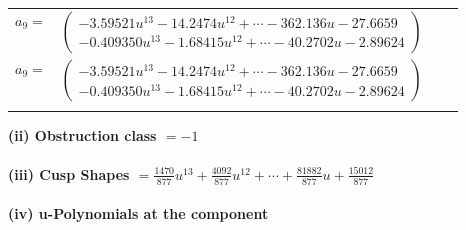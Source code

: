 \documentclass[1p]{elsarticle_modified}
\theoremstyle{definition}
\begin{document}
\begin{tabular}{m{7pt} m{180pt} m{7pt} m{180pt} }
\flushright $a_{9}=$&$\begin{pmatrix}-3.59521 u^{13}-14.2474 u^{12}+\cdots-362.136 u-27.6659\\-0.409350 u^{13}-1.68415 u^{12}+\cdots-40.2702 u-2.89624\end{pmatrix}$\\ \flushright $a_{9}=$&$\begin{pmatrix}-3.59521 u^{13}-14.2474 u^{12}+\cdots-362.136 u-27.6659\\-0.409350 u^{13}-1.68415 u^{12}+\cdots-40.2702 u-2.89624\end{pmatrix}$\\&\end{tabular}
\flushleft \textbf{(ii) Obstruction class $= -1$}\\~\\
\flushleft \textbf{(iii) Cusp Shapes $= \frac{1470}{877} u^{13}+\frac{4092}{877} u^{12}+\cdots+\frac{81882}{877} u+\frac{15012}{877}$}\\~\\
\newpage\renewcommand{\arraystretch}{1}
\flushleft \textbf{(iv) u-Polynomials at the component}\newline \\
\end{document}
